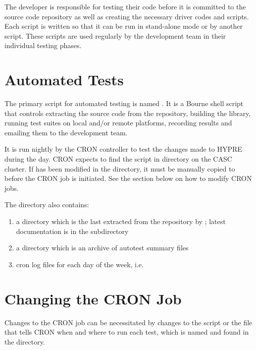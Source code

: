 The developer is responsible for testing their code before it is committed to the
source code repository as well as creating the necessary driver codes and scripts.
Each script is written so that it can be run in stand-alone mode or by another 
script.  These scripts are used regularly by the development team in their individual
testing phases.

\section{Automated Tests}
\label{Automated Tests}

The primary script for automated testing is named .  It is a Bourne 
shell script that controls extracting the source code from the repository, building 
the library, running test suites on local and/or remote platforms, recording results 
and emailing them to the development team. 

It is run nightly by the CRON controller to test the changes made to HYPRE during 
the day.  CRON expects to find the script in 
directory on the CASC cluster. If  has been modified in the 
directory, it must be manually copied to  
before the CRON job is initiated.  See the section below on how to modify CRON jobs.

The  directory also contains:
\begin{enumerate}
\item a  directory which is the last extracted from the repository
by ; latest documentation is in the  subdirectory
\item a  directory which is an archive of autotest summary files
\item cron log files for each day of the week, i.e. 
\end{enumerate}

\section{Changing the CRON Job}
\label{Changing the CRON Job}

Changes to the CRON job can be necessitated by changes to the  script or the
file that tells CRON when and where to run each test, which is named  and
found in the  directory.

